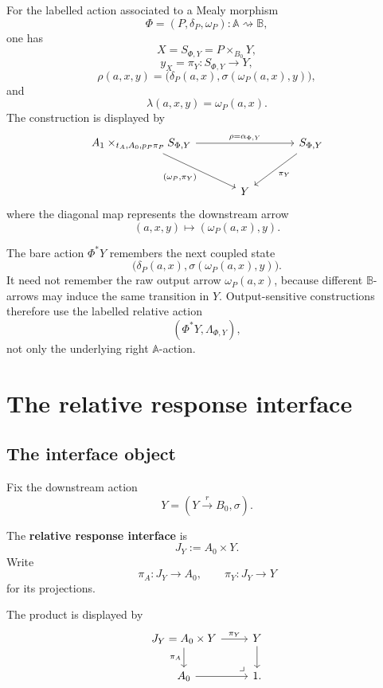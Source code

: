 For the labelled action associated to a Mealy morphism
\[
\Phi=(P,\delta_P,\omega_P):\mathbb A\rightsquigarrow\mathbb B,
\]
one has
\[
X=S_{\Phi,Y}=P\times_{B_0}Y,
\]
\[
y_X=\pi_Y:S_{\Phi,Y}\to Y,
\]
\[
\rho(a,x,y)
=
\bigl(
\delta_P(a,x),
\sigma(\omega_P(a,x),y)
\bigr),
\]
and
\[
\lambda(a,x,y)=\omega_P(a,x).
\]
The construction is displayed by
\[
\begin{tikzcd}[column sep=large,row sep=large]
A_1\times_{t_A,A_0,p_P\pi_P}S_{\Phi,Y}
  \arrow[rr,"{\rho=\alpha_{\Phi,Y}}"]
  \arrow[dr,"{(\omega_P,\pi_Y)}"']
&&
S_{\Phi,Y}
  \arrow[dl,"\pi_Y"]
\\
&
Y
&
\end{tikzcd}
\]
where the diagonal map represents the downstream arrow
\[
(a,x,y)\longmapsto(\omega_P(a,x),y).
\]

\begin{remark}
\label{rem:poly-relative-labelled-not-bare-action}
The bare action \(\Phi^\ast Y\) remembers the next coupled state
\[
\bigl(
\delta_P(a,x),
\sigma(\omega_P(a,x),y)
\bigr).
\]
It need not remember the raw output arrow \(\omega_P(a,x)\), because different
\(\mathbb B\)-arrows may induce the same transition in \(Y\).  Output-sensitive
constructions therefore use the labelled relative action
\[
(\Phi^\ast Y,\Lambda_{\Phi,Y}),
\]
not only the underlying right \(\mathbb A\)-action.
\end{remark}

\section{The relative response interface}
\label{sec:poly-relative-interface}

\subsection{The interface object}
\label{subsec:poly-relative-interface-object}

Fix the downstream action
\[
Y=(Y\xrightarrow{r}B_0,\sigma).
\]

\begin{definition}
\label{def:poly-relative-response-interface}
The \textbf{relative response interface} is
\[
J_Y:=A_0\times Y.
\]
Write
\[
\pi_A:J_Y\to A_0,
\qquad
\pi_Y:J_Y\to Y
\]
for its projections.
\end{definition}

The product is displayed by
\[
\begin{tikzcd}
J_Y=A_0\times Y
  \arrow[r,"\pi_Y"]
  \arrow[d,"\pi_A"']
&
Y
  \arrow[d]
\\
A_0
  \arrow[r]
&
1
\arrow[ul,phantom,very near start,"\lrcorner"] .
\end{tikzcd}
\]

